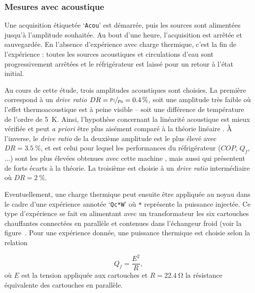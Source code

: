 
\subsubsection{Mesures avec acoustique}\label{chap:MesureAvecAcou} 
Une acquisition étiquetée `\texttt{Acou}' est démarrée, puis les sources sont alimentées jusqu'à l'amplitude souhaitée. Au bout d'une heure, l'acquisition est arrêtée et sauvegardée. En l'absence d'expérience avec charge thermique, c'est la fin de l'expérience : toutes les sources acoustiques et circulations d'eau sont progressivement arrêtées et le réfrigérateur est laissé pour un retour à l'état initial.

Au cours de cette étude, trois amplitudes acoustiques sont choisies. La première correspond à un \textit{drive ratio} $DR=\nicefrac{p_1}{p_0}=\qty{.4}{\percent}$, soit une amplitude très faible où l'effet thermoacoustique est à peine visible -- soit une différence de température de l'ordre de \qty{5}{\kelvin}. Ainsi, l'hypothèse concernant la linéarité acoustique est mieux vérifiée et peut \textit{a priori} être plus aisément comparé à la théorie linéaire . À l'inverse, le \textit{drive ratio} de la deuxième amplitude est le plus élevé avec $DR=\qty{3.5}{\percent}$, et est celui pour lequel les performances du réfrigérateur ($COP$, $Q_f$, ...) sont les plus élevées obtenues avec cette machine \cite{ramadan_design_2021}, mais aussi qui présentent de forts écarts à la théorie. La troisième est choisie à un \textit{drive ratio} intermédiaire où $DR=\qty{2}{\percent}$. \medskip

Eventuellement, une charge thermique peut ensuite être appliquée au noyau dans le cadre d'une expérience annotée `\texttt{Qc*W}' où \texttt{*} représente la puissance injectée. Ce type d'expérience se fait en alimentant avec un transformateur les six cartouches chauffantes connectées en parallèle et contenues dans l'échangeur froid (voir la figure~. Pour une expérience donnée, une puissance thermique est choisie selon la relation

\begin{equation}
	Q_f = \frac{E^2}{R},
	\label{eq:Qf_définitionEsurR}
\end{equation}
où $E$ est la tension appliquée aux cartouches et $R=\qty{22.4}{\ohm}$ la résistance équivalente des cartouches en parallèle. 

